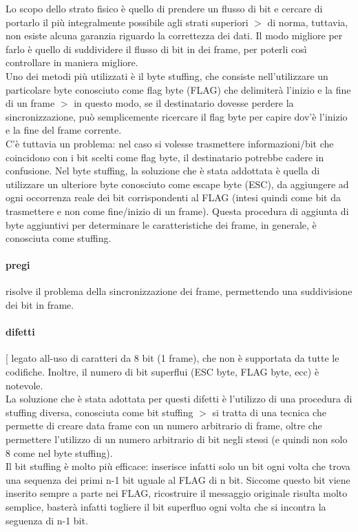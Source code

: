 \documentclass{article}
\begin{document}
Lo scopo dello strato fisico è quello di prendere un flusso di bit e cercare di
portarlo il più integralmente possibile agli strati superiori $>$ di norma,
tuttavia, non esiste alcuna garanzia riguardo la correttezza dei dati. Il modo
migliore per farlo è quello di suddividere il flusso di bit in dei frame, per
poterli così controllare in maniera migliore.\\
Uno dei metodi più utilizzati è il byte stuffing, che consiste nell'utilizzare
un particolare byte conosciuto come flag byte (FLAG) che delimiterà l'inizio e
la fine di un frame $>$ in questo modo, se il destinatario dovesse perdere la
sincronizzazione, può semplicemente ricercare il flag byte per capire dov'è
l'inizio e la fine del frame corrente.\\
C'è tuttavia un problema: nel caso si volesse trasmettere informazioni/bit che
coincidono con i bit scelti come flag byte, il destinatario potrebbe cadere in
confusione. Nel byte stuffing, la soluzione che è stata addottata è quella di
utilizzare un ulteriore byte conosciuto come escape byte (ESC), da aggiungere ad
ogni occorrenza reale dei bit corrispondenti al FLAG (intesi quindi come bit da
trasmettere e non come fine/inizio di un frame). Questa procedura di aggiunta di
byte aggiuntivi per determinare le caratteristiche dei frame, in generale, è
conosciuta come stuffing.

\paragraph{pregi} risolve il problema della sincronizzazione dei frame,
permettendo una suddivisione dei bit in frame.

\paragraph{difetti} [ legato all-uso di caratteri da 8 bit (1 frame), che non è
supportata da tutte le codifiche. Inoltre, il numero di bit superflui (ESC byte,
FLAG byte, ecc) è notevole.\\
La soluzione che è stata adottata per questi difetti è l'utilizzo di una
procedura di stuffing diversa, conosciuta come bit stuffing $>$ si tratta di una
tecnica che permette di creare data frame con un numero arbitrario di frame,
oltre che permettere l'utilizzo di un numero arbitrario di bit negli stessi (e
quindi non solo 8 come nel byte stuffing).\\
Il bit stuffing è molto più efficace: inserisce infatti solo un bit ogni volta
che trova una sequenza dei primi n-1 bit uguale al FLAG di n bit. Siccome questo
bit viene inserito sempre a parte nei FLAG, ricostruire il messaggio originale
risulta molto semplice, basterà infatti togliere il bit superfluo ogni volta che
si incontra la seguenza di n-1 bit.
\end{document}
